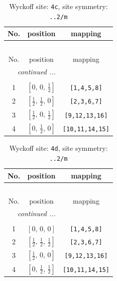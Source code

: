\documentclass[fleqn,8pt]{jsarticle}
\begin{document}
\renewcommand{\arraystretch}{1.2}
\begin{longtable}{ccc}
\caption{Wyckoff site: {\tt 4c}, site symmetry: {\tt ..2/m}}
 \\
 \hline \hline
No. & position & mapping \\ \hline \endfirsthead

\multicolumn{2}{l}{\tablename\ \thetable{}} \\
 \hline \hline
No. & position & mapping \\ \hline \endhead

 \hline \hline
\multicolumn{2}{r}{\footnotesize\it continued ...} \\ \endfoot

 \hline \hline
\multicolumn{2}{r}{} \\ \endlastfoot

1 & $\left[ 0,\, 0,\, \frac{1}{2} \right]$ & {\tt [1,4,5,8]} \\ \hline
2 & $\left[ \frac{1}{2},\, \frac{1}{2},\, 0 \right]$ & {\tt [2,3,6,7]} \\ \hline
3 & $\left[ \frac{1}{2},\, 0,\, \frac{1}{2} \right]$ & {\tt [9,12,13,16]} \\ \hline
4 & $\left[ 0,\, \frac{1}{2},\, 0 \right]$ & {\tt [10,11,14,15]} \\
\end{longtable}
\renewcommand{\arraystretch}{1.2}
\begin{longtable}{ccc}
\caption{Wyckoff site: {\tt 4d}, site symmetry: {\tt ..2/m}}
 \\
 \hline \hline
No. & position & mapping \\ \hline \endfirsthead

\multicolumn{2}{l}{\tablename\ \thetable{}} \\
 \hline \hline
No. & position & mapping \\ \hline \endhead

 \hline \hline
\multicolumn{2}{r}{\footnotesize\it continued ...} \\ \endfoot

 \hline \hline
\multicolumn{2}{r}{} \\ \endlastfoot

1 & $\left[ 0,\, 0,\, 0 \right]$ & {\tt [1,4,5,8]} \\ \hline
2 & $\left[ \frac{1}{2},\, \frac{1}{2},\, \frac{1}{2} \right]$ & {\tt [2,3,6,7]} \\ \hline
3 & $\left[ \frac{1}{2},\, 0,\, 0 \right]$ & {\tt [9,12,13,16]} \\ \hline
4 & $\left[ 0,\, \frac{1}{2},\, \frac{1}{2} \right]$ & {\tt [10,11,14,15]} \\
\end{longtable}
\end{document}

